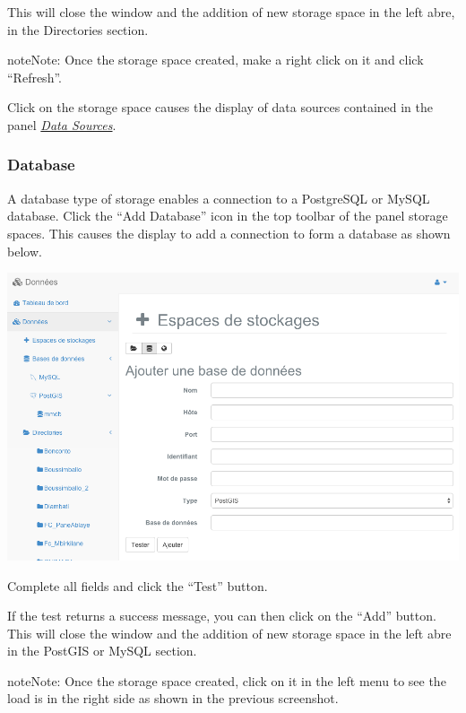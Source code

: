 \documentclass[letterpaper,10pt,english]{sphinxmanual}
\begin{document}
This will close the window and the addition of new storage space in the left abre, in the Directories section.

\begin{notice}{note}{Note:}
Once the storage space created, make a right click on it and click ``Refresh''.
\end{notice}

Click on the storage space causes the display of data sources contained in the panel {\hyperref[data/datasources::doc]{\emph{\emph{Data Sources}}}}.


\subsubsection{Database}
\label{data/datastores:base-de-donnees}
A database type of storage enables a connection to a PostgreSQL or MySQL database. Click the ``Add Database'' icon in the top toolbar of the panel storage spaces. This causes the display to add a connection to form a database as shown below.

\includegraphics[width=1.000\linewidth]{add-database-window.png}

Complete all fields and click the ``Test'' button.

If the test returns a success message, you can then click on the ``Add'' button. This will close the window and the addition of new storage space in the left abre in the PostGIS or MySQL section.

\begin{notice}{note}{Note:}
Once the storage space created, click on it in the left menu to see the load is in the right side as shown in the previous screenshot.
\end{notice}
\end{document}
